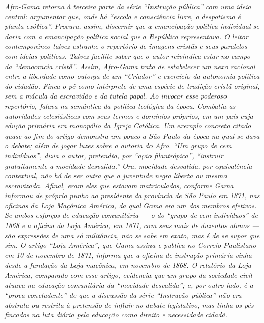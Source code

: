 \begin{didascalia}\itshape
Afro-Gama retorna à terceira parte da série ``Instrução pública''
com uma ideia central: argumentar que, onde há ``escola e
consciência livre, o despotismo é planta exótica''.
Procura, assim,
discernir que a emancipação política individual
se daria com a emancipação política social que a República
representava. O leitor contemporâneo talvez estranhe o repertório de
imagens cristãs e seus paralelos com
ideias políticas. Talvez facilite saber que o autor
reivindica estar no campo da ``democracia cristã''. Assim, Afro-Gama trata de estabelecer um nexo racional entre a liberdade
como outorga de um ``Criador'' e exercício da autonomia política do
cidadão. %
Finca o pé como intérprete de uma
espécie de tradição cristã original, sem a mácula da escravidão e da
tutela papal. Ao invocar esse poderoso repertório, falava
na semântica da política teológica da época.
Combatia as autoridades eclesiásticas com seus termos e domínios próprios, 
em um país cuja edução primária era monopólio da Igreja Católica.
Um exemplo concreto citado quase ao fim do
artigo demonstra um pouco a São Paulo da época na qual
se dava o debate; além de jogar luzes sobre a autoria do
Afro. ``Um grupo de cem indivíduos'', dizia o autor,
pretendia, por ``ação filantrópica'', ``instruir gratuitamente a mocidade
desvalida.'' Ora, mocidade desvalida, por equivalência contextual, não há
de ser outra que a juventude negra liberta ou mesmo
escravizada. Afinal, eram eles que estavam matriculados,
conforme Gama informou de próprio punho ao presidente da província de
São Paulo em 1871, nas oficinas da Loja Maçônica América, da qual Gama
era um dos membros efetivos. Se ambos esforços de educação comunitária
--- o do ``grupo de cem indivíduos'' de 1868 e a oficina da Loja América,
em 1871, com seus mais de duzentos alunos --- são expressões de uma só
militância, não se sabe em exato, mas é de se supor que sim. O
artigo ``Loja América'', que Gama assina e publica no \textnormal{Correio
Paulistano} em 10 de novembro de 1871, informa que a oficina de instrução
primária vinha desde a fundação da Loja maçônica, em novembro de 1868.
O relatório da Loja América, comparado com esse artigo, evidencia
que um grupo da sociedade civil atuava na educação comunitária da ``mocidade
desvalida''; e, por outro lado, é a ``prova concludente'' de que a discussão da série
``Instrução pública'' não era abstrata ou restrita à pretensão
de influir no debate legislativo, mas tinha os pés
fincados na luta diária pela educação como direito e necessidade
cidadã.
\end{didascalia}



